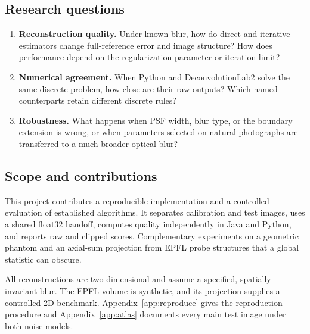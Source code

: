 \subsection{Research questions}

\begin{enumerate}
\item \textbf{Reconstruction quality.} Under known blur, how do direct and iterative estimators change full-reference error and image structure? How does performance depend on the regularization parameter or iteration limit?
\item \textbf{Numerical agreement.} When Python and DeconvolutionLab2 solve the same discrete problem, how close are their raw outputs? Which named counterparts retain different discrete rules?
\item \textbf{Robustness.} What happens when PSF width, blur type, or the boundary extension is wrong, or when parameters selected on natural photographs are transferred to a much broader optical blur?
\end{enumerate}

\subsection{Scope and contributions}

This project contributes a reproducible implementation and a controlled evaluation of established algorithms. It separates calibration and test images, uses a shared float32 handoff, computes quality independently in Java and Python, and reports raw and clipped scores. Complementary experiments on a geometric phantom and an axial-sum projection from EPFL probe structures that a global statistic can obscure.

All reconstructions are two-dimensional and assume a specified, spatially invariant blur. The EPFL volume is synthetic, and its projection supplies a controlled 2D benchmark. Appendix~\ref{app:reproduce} gives the reproduction procedure and Appendix~\ref{app:atlas} documents every main test image under both noise models.
